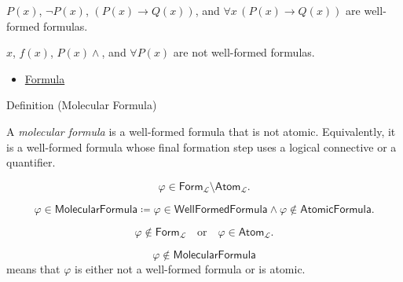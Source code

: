 \begin{remark*}[Examples]
\(P(x)\), \(\neg P(x)\), \((P(x)\to Q(x))\), and
\(\forall x\,(P(x)\to Q(x))\) are well-formed formulas.
\end{remark*}

\begin{remark*}
\(x\), \(f(x)\), \(P(x)\land\), and \(\forall P(x)\) are not well-formed
formulas.
\end{remark*}

\begin{dependencies}
\begin{itemize}
  \item \hyperref[def:formula]{Formula}
\end{itemize}
\end{dependencies}

\begin{definitionbox}{Definition (Molecular Formula)}
\begin{definition}
\label{def:molecular}
A \emph{molecular formula} is a well-formed formula that is not atomic.
Equivalently, it is a well-formed formula whose final formation step uses a
logical connective or a quantifier.
\end{definition}
\end{definitionbox}

\begin{remark*}
\[
\varphi\in\mathsf{Form}_{\mathcal L}\setminus\mathsf{Atom}_{\mathcal L}.
\]
\end{remark*}

\begin{remark*}
\[
\varphi\in\mathsf{MolecularFormula}
\coloneqq
\varphi\in\mathsf{WellFormedFormula}
\land
\varphi\notin\mathsf{AtomicFormula}.
\]
\end{remark*}

\begin{remark*}
\[
\varphi\notin\mathsf{Form}_{\mathcal L}
\quad\text{or}\quad
\varphi\in\mathsf{Atom}_{\mathcal L}.
\]
\end{remark*}

\begin{remark*}
\[
  \varphi\notin\mathsf{MolecularFormula}
\] means that \(\varphi\) is
either not a well-formed formula or is atomic.
\end{remark*}

